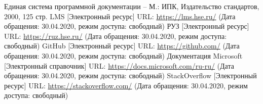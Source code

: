 \documentclass{../includes/TechDoc}
\begin{document}
    \begin{thebibliography}{3}
        Единая система программной документации – М.: ИПК, Издательство стандартов, 2000, 125 стр.
         LMS [Электронный ресурс] URL: \url{https://lms.hse.ru/} (Дата обращения: 30.04.2020, режим доступа: свободный)
         РУЗ [Электронный ресурс] URL: \url{https://ruz.hse.ru/} (Дата обращения: 30.04.2020, режим доступа: свободный)
         GitHub [Электронный ресурс] URL: \url{https://github.com/} (Дата обращения: 30.04.2020, режим доступа: свободный)
         Документация Microsoft [Электронный справочник] URL: \url{https://docs.microsoft.com/ru-ru/} (Дата обращения: 30.04.2020, режим доступа: свободный)
         StackOverflow [Электронный ресурс] URL: \url{https://stackoverflow.com/} (Дата обращения: 30.04.2020, режим доступа: свободный)
    \end{thebibliography}

    \registrationList
\end{document}
